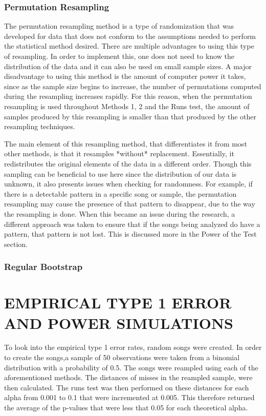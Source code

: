 \documentclass[12pt, letterpaper]{article}
\begin{document}
\subsubsection{Permutation Resampling}
The permutation resampling method is a type of randomization that was developed for data that does not conform to the assumptions needed to perform the statistical method desired. There are multiple advantages to using this type of resampling. In order to implement this, one does not need to know the distribution of the data and it can also be used on small sample sizes. A major disadvantage to using this method is the amount of computer power it takes, since as the sample size begins to increase, the number of permutations computed during the resampling increases rapidly. For this reason, when the permutation resampling is used throughout Methods 1, 2 and the Runs test, the amount of samples produced by this resampling is smaller than that produced by the other resampling techniques.

The main element of this resampling method, that differentiates it from most other methods, is that it resamples *without* replacement. Essentially, it redistributes the original elements of the data in a different order. Though this sampling can be beneficial to use here since the distribution of our data is unknown, it also presents issues when checking for randomness. For example, if there is a detectable pattern in a specific song or sample, the permutation resampling may cause the presence of that pattern to disappear, due to the way the resampling is done. When this became an issue during the research, a different approach was taken to ensure that if the songs being analyzed do have a pattern, that pattern is not lost. This is discussed more in the Power of the Test section. 

\subsubsection{Regular Bootstrap}


\section{EMPIRICAL TYPE 1 ERROR AND POWER SIMULATIONS}
To look into the empirical type 1 error rates, random songs were created. In order to create the songs,a sample of 50 observations were taken from a binomial distribution with a probability of 0.5. The songs were reampled using each of the aforementioned methods. The distances of misses in the reampled sample, were then calculated. The runs test was then performed on these distances for each alpha from 0.001 to 0.1 that were incremented at 0.005. This therefore returned the average of the p-values that were less that 0.05 for each theoretical alpha. 
\end{document}

